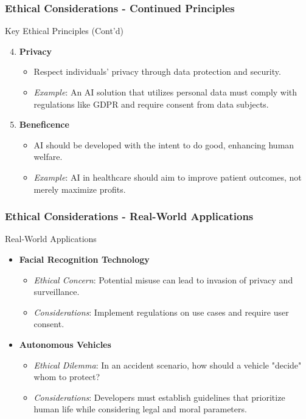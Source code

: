 \documentclass[aspectratio=169]{beamer}
\begin{document}
\begin{frame}[fragile]
    \frametitle{Ethical Considerations - Continued Principles}
    \begin{block}{Key Ethical Principles (Cont'd)}
        \begin{enumerate}
            \setcounter{enumi}{3}
            \item \textbf{Privacy}
            \begin{itemize}
                \item Respect individuals' privacy through data protection and security.
                \item \textit{Example}: An AI solution that utilizes personal data must comply with regulations like GDPR and require consent from data subjects.
            \end{itemize}
            
            \item \textbf{Beneficence}
            \begin{itemize}
                \item AI should be developed with the intent to do good, enhancing human welfare.
                \item \textit{Example}: AI in healthcare should aim to improve patient outcomes, not merely maximize profits.
            \end{itemize}
        \end{enumerate}
    \end{block}
\end{frame}

\begin{frame}[fragile]
    \frametitle{Ethical Considerations - Real-World Applications}
    \begin{block}{Real-World Applications}
        \begin{itemize}
            \item \textbf{Facial Recognition Technology}
            \begin{itemize}
                \item \textit{Ethical Concern}: Potential misuse can lead to invasion of privacy and surveillance.
                \item \textit{Considerations}: Implement regulations on use cases and require user consent.
            \end{itemize}
            
            \item \textbf{Autonomous Vehicles}
            \begin{itemize}
                \item \textit{Ethical Dilemma}: In an accident scenario, how should a vehicle "decide" whom to protect?
                \item \textit{Considerations}: Developers must establish guidelines that prioritize human life while considering legal and moral parameters.
            \end{itemize}
        \end{itemize}
    \end{block}
\end{frame}
\end{document}
